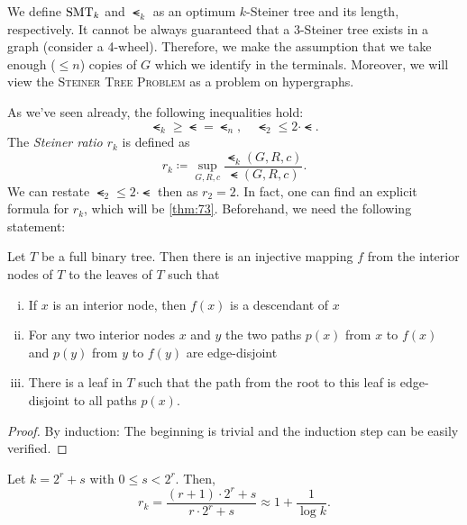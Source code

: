\documentclass[../skript.tex]{subfiles}
\begin{document}
We define $\operatorname{SMT}_k$ and $\smt_k$ as an optimum $k$-Steiner tree and its length, respectively.
It cannot be always guaranteed that a $3$-Steiner tree exists in a graph (consider a 4-wheel). Therefore, we make the assumption that we take enough ($\leq n$) copies of $G$ which we identify in the terminals.
Moreover, we will view the \textsc{Steiner Tree Problem} as a problem on hypergraphs.

As we've seen already, the following inequalities hold:
\[
	\smt_k \geq \smt = \smt_n, \quad \smt_2 \leq 2 \cdot \smt.
\]
The \emph{Steiner ratio $r_k$} is defined as
\[
	r_k \coloneqq \sup_{G, R, c} \frac{\smt_k(G, R, c)}{\smt(G, R, c)}.
\]
We can restate $\smt_2 \leq 2 \cdot \smt$ then as $r_2 = 2$. In fact, one can find an explicit formula for $r_k$, which will be \cref{thm:73}. Beforehand, we need the following statement:
\begin{proposition} %
\label{thm:72}
Let $T$ be a full binary tree. Then there is an injective mapping $f$ from the interior nodes of $T$ to the leaves of $T$ such that
\begin{enumerate}[(i)]
\item If $x$ is an interior node, then $f(x)$ is a descendant of $x$
\item For any two interior nodes $x$ and $y$ the two paths $p(x)$ from $x$ to $f(x)$ and $p(y)$ from $y$ to $f(y)$ are edge-disjoint
\item There is a leaf in $T$ such that the path from the root to this leaf is edge-disjoint to all paths $p(x)$.
\end{enumerate}
\end{proposition}
\begin{proof}
By induction: The beginning is trivial and the induction step can be easily verified.
\end{proof}
\begin{theorem} %
\label{thm:73}
Let $k = 2^r + s$ with $0 \leq s < 2^r$.
Then,
\[
	r_k = \frac{(r+1) \cdot 2^r + s}{r \cdot 2^r + s} \approx 1 + \frac{1}{\log k}.
\]
\end{theorem}
\end{document}

